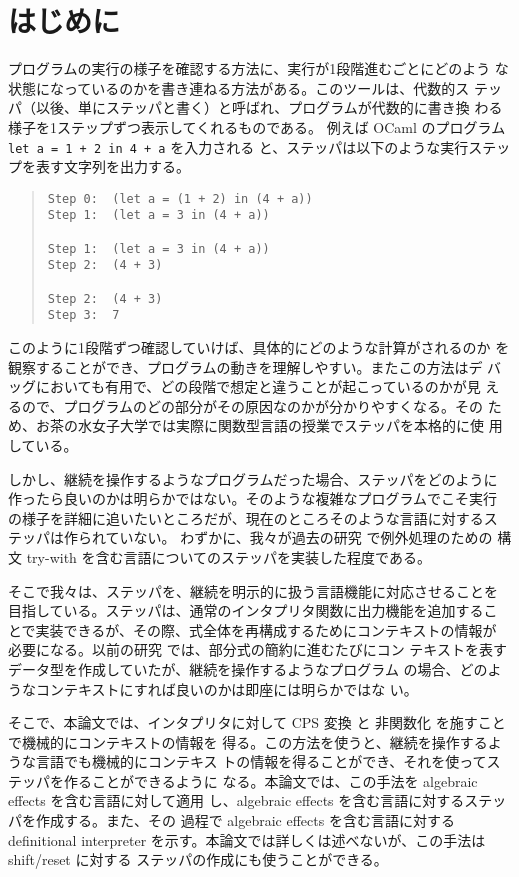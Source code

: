 \section{はじめに}

プログラムの実行の様子を確認する方法に、実行が1段階進むごとにどのよう
な状態になっているのかを書き連ねる方法がある。このツールは、代数的ス
テッパ（以後、単にステッパと書く）と呼ばれ、プログラムが代数的に書き換
わる様子を1ステップずつ表示してくれるものである。
例えば OCaml のプログラム \texttt{let a = 1 + 2 in 4 + a} を入力される
と、ステッパは以下のような実行ステップを表す文字列を出力する。

\begin{quote}
\begin{verbatim}
Step 0:  (let a = (1 + 2) in (4 + a))
Step 1:  (let a = 3 in (4 + a))

Step 1:  (let a = 3 in (4 + a))
Step 2:  (4 + 3)

Step 2:  (4 + 3)
Step 3:  7
\end{verbatim}
\end{quote}

このように1段階ずつ確認していけば、具体的にどのような計算がされるのか
を観察することができ、プログラムの動きを理解しやすい。またこの方法はデ
バッグにおいても有用で、どの段階で想定と違うことが起こっているのかが見
えるので、プログラムのどの部分がその原因なのかが分かりやすくなる。その
ため、お茶の水女子大学では実際に関数型言語の授業でステッパを本格的に使
用している。

しかし、継続を操作するようなプログラムだった場合、ステッパをどのように
作ったら良いのかは明らかではない。そのような複雑なプログラムでこそ実行
の様子を詳細に追いたいところだが、現在のところそのような言語に対するス
テッパは作られていない。
わずかに、我々が過去の研究 \cite{FCA19} で例外処理のための
構文 try-with を含む言語についてのステッパを実装した程度である。

そこで我々は、ステッパを、継続を明示的に扱う言語機能に対応させることを
目指している。ステッパは、通常のインタプリタ関数に出力機能を追加するこ
とで実装できるが、その際、式全体を再構成するためにコンテキストの情報が
必要になる。以前の研究 \cite{FCA19} では、部分式の簡約に進むたびにコン
テキストを表すデータ型を作成していたが、継続を操作するようなプログラム
の場合、どのようなコンテキストにすれば良いのかは即座には明らかではな
い。

そこで、本論文では、インタプリタに対して CPS 変換 \cite{PLOTKIN1975125} と
非関数化 \cite{Reynolds1998} を施すことで機械的にコンテキストの情報を
得る。この方法を使うと、継続を操作するような言語でも機械的にコンテキス
トの情報を得ることができ、それを使ってステッパを作ることができるように
なる。本論文では、この手法を algebraic effects を含む言語に対して適用
し、algebraic effects を含む言語に対するステッパを作成する。また、その
過程で algebraic effects を含む言語に対する definitional interpreter
を示す。本論文では詳しくは述べないが、この手法は shift/reset に対する
ステッパの作成にも使うことができる。

